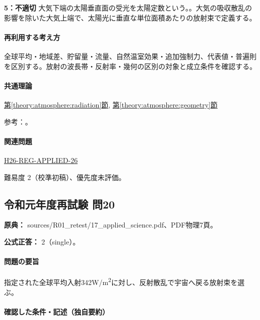 \noindent\textbf{5：不適切} 大気下端の太陽垂直面の受光を太陽定数という。。大気の吸収散乱の影響を除いた大気上端で、太陽光に垂直な単位面積あたりの放射束で定義する。\par

\paragraph{再利用する考え方} 全球平均・地域差、貯留量・流量、自然温室効果・追加強制力、代表値・普遍則を区別する。放射の波長帯・反射率・幾何の区別の対象と成立条件を確認する。

\paragraph{共通理論} \hyperref[theory:atmosphere:radiation]{第\ref*{theory:atmosphere:radiation}節}, \hyperref[theory:atmosphere:geometry]{第\ref*{theory:atmosphere:geometry}節}

\par 参考：\cite{atm_nasa_budget,atm_nasa_transport}。

\paragraph{関連問題} \hyperref[q:h26-reg-applied-26]{H26-REG-APPLIED-26}

\par 難易度 2（校準初稿）、優先度未評価。

\subsection{令和元年度再試験 問20}
\label{q:r01-ret-applied-20}

\noindent\textbf{原典：} sources/R01\_retest/17\_applied\_science.pdf、PDF物理7頁。

\textbf{公式正答：} 2（single）。

\paragraph{問題の要旨} 指定された全球平均入射342W/m\textsuperscript{2}に対し、反射散乱で宇宙へ戻る放射束を選ぶ。

\paragraph{確認した条件・記述（独自要約）}\mbox{}\par

